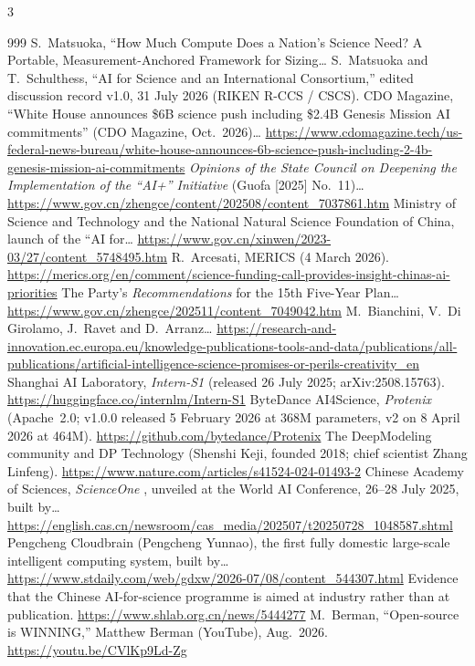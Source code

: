 \begin{multicols}{3}
\begin{thebibliography}{999}
 S.~Matsuoka, ``How Much Compute Does a Nation's Science Need? A Portable, Measurement-Anchored Framework for Sizing…
 S.~Matsuoka and T.~Schulthess, ``AI for Science and an International Consortium,'' edited discussion record v1.0, 31 July 2026 (RIKEN R-CCS / CSCS).
 CDO Magazine, ``White House announces \$6B science push including \$2.4B Genesis Mission AI commitments'' (CDO Magazine, Oct.\ 2026)… \url{https://www.cdomagazine.tech/us-federal-news-bureau/white-house-announces-6b-science-push-including-2-4b-genesis-mission-ai-commitments}
 \emph{Opinions of the State Council on Deepening the Implementation of the ``AI+'' Initiative} (Guofa [2025] No.~11)… \url{https://www.gov.cn/zhengce/content/202508/content_7037861.htm}
 Ministry of Science and Technology and the National Natural Science Foundation of China, launch of the ``AI for… \url{https://www.gov.cn/xinwen/2023-03/27/content_5748495.htm}
 R.~Arcesati, MERICS (4 March 2026). \url{https://merics.org/en/comment/science-funding-call-provides-insight-chinas-ai-priorities}
 The Party's \emph{Recommendations} for the 15th Five-Year Plan… \url{https://www.gov.cn/zhengce/202511/content_7049042.htm}
 M.~Bianchini, V.~Di Girolamo, J.~Ravet and D.~Arranz… \url{https://research-and-innovation.ec.europa.eu/knowledge-publications-tools-and-data/publications/all-publications/artificial-intelligence-science-promises-or-perils-creativity_en}
 Shanghai AI Laboratory, \emph{Intern-S1} (released 26 July 2025; arXiv:2508.15763). \url{https://huggingface.co/internlm/Intern-S1}
 ByteDance AI4Science, \emph{Protenix} (Apache~2.0; v1.0.0 released 5 February 2026 at 368M parameters, v2 on 8 April 2026 at 464M). \url{https://github.com/bytedance/Protenix}
 The DeepModeling community and DP Technology (Shenshi Keji, founded 2018; chief scientist Zhang Linfeng). \url{https://www.nature.com/articles/s41524-024-01493-2}
 Chinese Academy of Sciences, \emph{ScienceOne} , unveiled at the World AI Conference, 26--28 July 2025, built by… \url{https://english.cas.cn/newsroom/cas_media/202507/t20250728_1048587.shtml}
 Pengcheng Cloudbrain (Pengcheng Yunnao), the first fully domestic large-scale intelligent computing system, built by… \url{https://www.stdaily.com/web/gdxw/2026-07/08/content_544307.html}
 Evidence that the Chinese AI-for-science programme is aimed at industry rather than at publication. \url{https://www.shlab.org.cn/news/5444277}
 M.~Berman, ``Open-source is WINNING,'' Matthew Berman (YouTube), Aug.\ 2026. \url{https://youtu.be/CVlKp9Ld-Zg}
\end{thebibliography}
\end{multicols}
\endgroup
